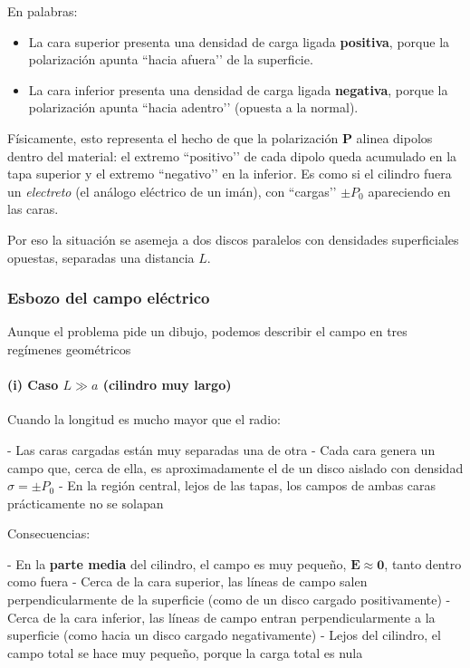 \documentclass{article}
\begin{document}
En palabras:

\begin{itemize}
    \item La cara superior presenta una densidad de carga ligada \textbf{positiva},
    porque la polarización apunta “hacia afuera’’ de la superficie.
    \item La cara inferior presenta una densidad de carga ligada \textbf{negativa},
    porque la polarización apunta “hacia adentro’’ (opuesta a la normal).
\end{itemize}

Físicamente, esto representa el hecho de que la polarización 
$\mathbf{P}$ alinea dipolos dentro del material:
el extremo “positivo’’ de cada dipolo queda acumulado en la tapa superior y el 
extremo “negativo’’ en la inferior. Es como si el cilindro fuera un 
\emph{electreto} (el análogo eléctrico de un imán), con “cargas’’ $\pm P_{0}$ 
apareciendo en las caras.

Por eso la situación se asemeja a dos discos paralelos con densidades 
superficiales opuestas, separadas una distancia $L$.

\subsubsection*{Esbozo del campo eléctrico}

Aunque el problema pide un dibujo, podemos describir el campo en tres regímenes geométricos

\paragraph{(i) Caso $L \gg a$ (cilindro muy largo)}

Cuando la longitud es mucho mayor que el radio:

- Las caras cargadas están muy separadas una de otra  
- Cada cara genera un campo que, cerca de ella, es aproximadamente el de un disco aislado con densidad $\sigma = \pm P_{0}$  
- En la región central, lejos de las tapas, los campos de ambas caras prácticamente no se solapan

Consecuencias:

- En la \textbf{parte media} del cilindro, el campo es muy pequeño, $\mathbf{E} \approx \mathbf{0}$, tanto dentro como fuera  
- Cerca de la cara superior, las líneas de campo salen perpendicularmente de la superficie (como de un disco cargado positivamente)  
- Cerca de la cara inferior, las líneas de campo entran perpendicularmente a la superficie (como hacia un disco cargado negativamente)  
- Lejos del cilindro, el campo total se hace muy pequeño, porque la carga total es nula
\end{document}

